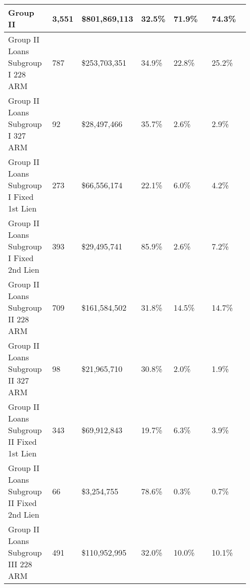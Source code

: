 \begin{longtable}{|p{0.2\linewidth}|p{0.1\linewidth}|p{0.15\linewidth}|p{0.1\linewidth}|p{0.2\linewidth}|p{0.2\linewidth}|}
\hline
Group II                                   &                        3,551 &                   \$801,869,113 &                              32.5\% &                         71.9\% &                                              74.3\% \\
\hline
Group II Loans Subgroup I 228 ARM          &                          787 &                   \$253,703,351 &                              34.9\% &                         22.8\% &                                              25.2\% \\
\hline
Group II Loans Subgroup I 327 ARM          &                           92 &                    \$28,497,466 &                              35.7\% &                          2.6\% &                                               2.9\% \\
\hline
Group II Loans Subgroup I Fixed 1st Lien   &                          273 &                    \$66,556,174 &                              22.1\% &                          6.0\% &                                               4.2\% \\
\hline
Group II Loans Subgroup I Fixed 2nd Lien   &                          393 &                    \$29,495,741 &                              85.9\% &                          2.6\% &                                               7.2\% \\
\hline
Group II Loans Subgroup II 228 ARM         &                          709 &                   \$161,584,502 &                              31.8\% &                         14.5\% &                                              14.7\% \\
\hline
Group II Loans Subgroup II 327 ARM         &                           98 &                    \$21,965,710 &                              30.8\% &                          2.0\% &                                               1.9\% \\
\hline
Group II Loans Subgroup II Fixed 1st Lien  &                          343 &                    \$69,912,843 &                              19.7\% &                          6.3\% &                                               3.9\% \\
\hline
Group II Loans Subgroup II Fixed 2nd Lien  &                           66 &                     \$3,254,755 &                              78.6\% &                          0.3\% &                                               0.7\% \\
\hline
Group II Loans Subgroup III 228 ARM        &                          491 &                   \$110,952,995 &                              32.0\% &                         10.0\% &                                              10.1\% \\

\end{longtable}
